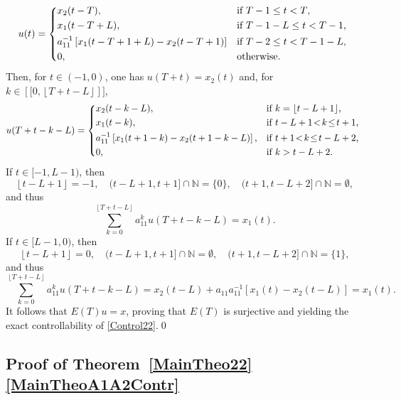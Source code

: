 \documentclass[JEP,XML,SOM,Unicode]{cedram}
\newcommand{\llbracket}{[\![}
\newcommand{\rrbracket}{]\!]}
\theoremstyle{plain}
\theoremstyle{definition}
\newcommand{\floor}[1]{\left\lfloor #1 \right\rfloor}
\begin{document}
\[
u(t) =
\begin{dcases*}
x_2(t - T), & if $T - 1 \leq t < T$, \\
x_1(t - T + L), & if $T - 1 - L \leq t < T - 1$, \\
a_{11}^{-1} \left[x_1(t - T + 1 + L) - x_2(t - T + 1)\right] & if $T - 2 \leq t < T - 1 - L$, \\
0, & otherwise.
\end{dcases*}
\]
Then, for $t \in (-1, 0)$, one has $u(T + t) = x_2(t)$ and, for $k \in \left\llbracket 0, \floor{T + t - L}\right\rrbracket$,
\[
u(T + t - k - L) =
\begin{dcases*}
x_2(t - k - L), & if $k = \floor{t - L + 1}$, \\
x_1(t - k), & if $t - L + 1 \!<\! k \!\leq\! t + 1$, \\
a_{11}^{-1} \left[x_1(t + 1 - k) - x_2(t + 1 - k - L)\right], & if $t + 1 \!<\! k \!\leq\! t - L + 2$, \\
0, & if $k > t - L + 2$.
\end{dcases*}
\]
If $t \in [-1, L - 1)$, then
\[
\floor{t - L + 1} = -1,\quad (t - L + 1, t + 1] \cap \mathbb N = \{0\},\quad (t + 1, t - L + 2] \cap \mathbb N = \emptyset,
\]
and thus
\[
\sum_{k=0}^{\floor{T + t - L}} a_{11}^k u(T + t - k - L) = x_1(t).
\]
If $t \in [L - 1, 0)$, then
\[
\floor{t - L + 1} = 0,\quad (t - L + 1, t + 1] \cap \mathbb N = \emptyset,\quad (t + 1, t - L + 2] \cap \mathbb N = \{1\},
\]
and thus
\[
\sum_{k=0}^{\floor{T + t - L}} a_{11}^k u(T + t - k - L) = x_2(t - L) + a_{11} a_{11}^{-1} \left[x_1(t) - x_2(t - L)\right] = x_1(t).
\]
It follows that $E(T) u = x$, proving that $E(T)$ is surjective and yielding the exact controllability of \eqref{Control22}.\qed

\subsection{Proof of Theorem~\ref{MainTheo22}\eqref{MainTheoA1A2Contr}}
\label{SecProofCaseC}
\end{document}
